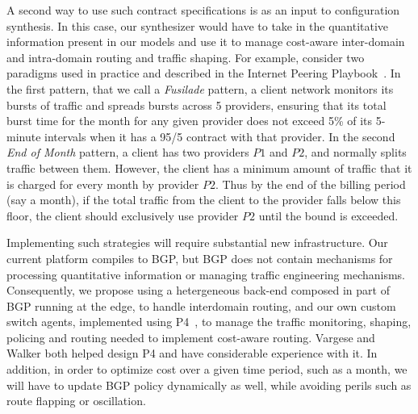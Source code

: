 A second way to use such contract specifications is as an input to configuration synthesis.  In this case,
our synthesizer would have to take in the quantitative information present in our models and use it to
manage cost-aware inter-domain and intra-domain routing and traffic shaping.  For example,
consider two paradigms used in practice and described in the Internet Peering Playbook~\cite{routingplaybook}.   
In the first pattern, that we call a {\em Fusilade} pattern, a client network monitors its bursts of traffic and
spreads bursts across 5 providers, ensuring that its total burst time for the month for any given provider 
does not exceed 5\% of its 5-minute intervals when it has a 95/5 contract with that provider.
In the second {\em End of Month} pattern, a client has two providers $P1$ and $P2$, and normally splits traffic between them.  However, the client has a minimum amount of traffic that it is charged for every month by provider $P2$.   Thus by the end of the billing period (say a month), if the total traffic from the client to the provider falls below this floor, the client should exclusively use provider $P2$ until the bound is exceeded.

Implementing such strategies will require substantial new infrastructure.  Our current platform compiles to BGP, 
but BGP does not contain mechanisms for processing quantitative information or managing
traffic engineering mechanisms.  Consequently, we propose using a hetergeneous
back-end composed in part of BGP running at the edge, to handle interdomain
routing, and our own custom switch agents, implemented using P4~\cite{P4}, 
to manage the traffic monitoring, shaping, policing and routing needed to implement
cost-aware routing.  Vargese and Walker both helped design P4 and have considerable experience with it.
In addition, in order to optimize cost over a given time period, 
such as a month, we will have to update BGP policy dynamically as well,
while avoiding perils such as route flapping or oscillation.



